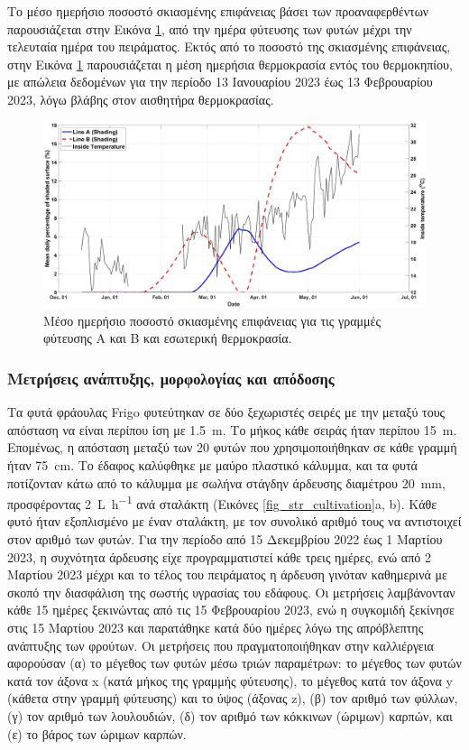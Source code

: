 \documentclass[12pt, a4paper]{report} %
\newcommand{\english}{\foreignlanguage{english}}
\begin{document}
Το μέσο ημερήσιο ποσοστό σκιασμένης επιφάνειας βάσει των προαναφερθέντων παρουσιάζεται στην Εικόνα 
\ref{fig_str_shading_temp}, από την ημέρα φύτευσης των φυτών μέχρι την τελευταία ημέρα του πειράματος. 
Εκτός από το ποσοστό της σκιασμένης επιφάνειας, στην Εικόνα \ref{fig_str_shading_temp} παρουσιάζεται η μέση ημερήσια 
θερμοκρασία εντός του θερμοκηπίου, με απώλεια δεδομένων για την περίοδο 13 Ιανουαρίου 2023 έως 13 Φεβρουαρίου 2023, 
λόγω βλάβης στον αισθητήρα θερμοκρασίας.

\begin{figure}[H]
    \centering
    \includegraphics[width=0.9\linewidth]{str_shading_temp.jpg}
    \caption{Μέσο ημερήσιο ποσοστό σκιασμένης επιφάνειας για τις γραμμές φύτευσης Α και Β και εσωτερική θερμοκρασία.}
    \label{fig_str_shading_temp}
\end{figure}

\subsubsection{Μετρήσεις ανάπτυξης, μορφολογίας και απόδοσης}\label{subsub_str_quantitive}
Τα φυτά φράουλας \english{Frigo} φυτεύτηκαν σε δύο ξεχωριστές σειρές με την μεταξύ τους απόσταση να είναι περίπου 
ίση με \SI{1.5}{\meter}. Το μήκος κάθε σειράς ήταν περίπου \SI{15}{\meter}. Επομένως, η απόσταση μεταξύ των 20 
φυτών που χρησιμοποιήθηκαν σε κάθε γραμμή ήταν \SI{75}{\centi\meter}. Το έδαφος καλύφθηκε με μαύρο πλαστικό 
κάλυμμα, και τα φυτά ποτίζονταν κάτω από το κάλυμμα με σωλήνα στάγδην άρδευσης διαμέτρου \SI{20}{\milli\meter}, 
προσφέροντας \SI{2}{\liter\per\hour} ανά σταλάκτη (Εικόνες \ref{fig_str_cultivation}a, b). Κάθε φυτό ήταν 
εξοπλισμένο με έναν σταλάκτη, με τον συνολικό αριθμό τους να αντιστοιχεί στον αριθμό των φυτών. Για την περίοδο 
από 15 Δεκεμβρίου 2022 έως 1 Μαρτίου 2023, η συχνότητα άρδευσης είχε προγραμματιστεί κάθε τρεις ημέρες, ενώ από 
2 Μαρτίου 2023 μέχρι και το τέλος του πειράματος η άρδευση γινόταν καθημερινά με σκοπό την διασφάλιση της σωστής 
υγρασίας του εδάφους. Οι μετρήσεις λαμβάνονταν κάθε 15 ημέρες ξεκινώντας από τις 15 Φεβρουαρίου 2023, ενώ η 
συγκομιδή ξεκίνησε στις 15 Μαρτίου 2023 και παρατάθηκε κατά δύο ημέρες λόγω της απρόβλεπτης ανάπτυξης των φρούτων. 
Οι μετρήσεις που πραγματοποιήθηκαν στην καλλιέργεια αφορούσαν (α) το μέγεθος των φυτών μέσω τριών παραμέτρων: το 
μέγεθος των φυτών κατά τον άξονα \english{x} (κατά μήκος της γραμμής φύτευσης), το μέγεθος κατά τον άξονα 
\english{y} (κάθετα στην γραμμή φύτευσης) και το ύψος (άξονας \english{z}), (β) τον αριθμό των φύλλων, (γ) τον 
αριθμό των λουλουδιών, (δ) τον αριθμό των κόκκινων (ώριμων) καρπών, και (ε) το βάρος των ώριμων καρπών.
\end{document}
